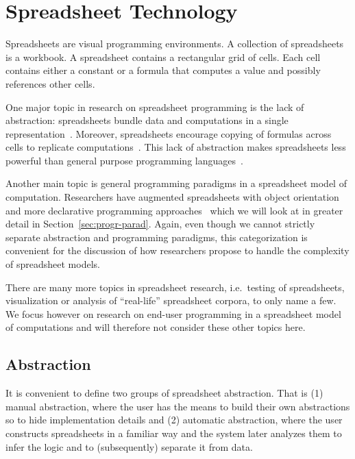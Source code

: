 \documentclass[a4paper]{article}
\begin{document}
\section{Spreadsheet Technology}
\label{sec:spreadsheet-end-user-dev}

Spreadsheets are visual programming environments. A collection of spreadsheets is a workbook. A spreadsheet contains a rectangular grid of cells. Each cell contains either a constant or a formula that computes a value and possibly references other cells.

One major topic in research on spreadsheet programming is the lack of abstraction: spreadsheets bundle data and computations in a single representation~\cite{Isakowitz:1995:TLT:195705.195708}. Moreover, spreadsheets encourage copying of formulas across cells to replicate computations~\cite{1173080, Benfield:2009:FFD:1668113.1668121}. This lack of abstraction makes spreadsheets less powerful than general purpose programming languages~\cite{Miller:2015:SPB:2814189.2814201}.

Another main topic is general programming paradigms in a spreadsheet model of computation. Researchers have augmented spreadsheets with object orientation~\cite{Benfield:2009:FFD:1668113.1668121} and more declarative programming approaches~\cite{Stadelmann:1993:SBC:168642.168664, Singh:2016:TSD:2837614.2837668} which we will look at in greater detail in Section~\ref{sec:progr-parad}. Again, even though we cannot strictly separate abstraction and programming paradigms, this categorization is convenient for the discussion of how researchers propose to handle the complexity of spreadsheet models.

There are many more topics in spreadsheet research, i.e.\ testing of spreadsheets, visualization or analysis of ``real-life'' spreadsheet corpora, to only name a few. We focus however on research on end-user programming in a spreadsheet model of computations and will therefore not consider these other topics here.

\subsection{Abstraction}
\label{sec:abstraction}

It is convenient to define two groups of spreadsheet abstraction. That is (1) manual abstraction, where the user has the means to build their own abstractions so to hide implementation details and (2) automatic abstraction, where the user constructs spreadsheets in a familiar way and the system later analyzes them to infer the logic and to (subsequently) separate it from data.
\end{document}
